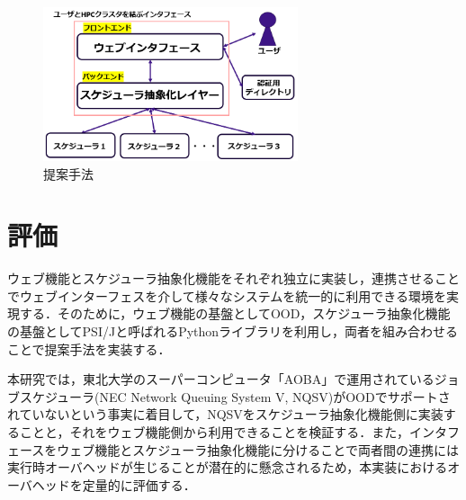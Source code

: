 \documentclass[a4paper,oneside,twocolumn,notitlepage,dvipdfmx]{jsarticle}
\begin{document}
\begin{figure}[h]
  \centering
  \includegraphics[width=75mm]{./fig/proposed_method.png}
  \caption{提案手法}
  \label{fig1}
\end{figure}

\section{評価}
ウェブ機能とスケジューラ抽象化機能をそれぞれ独立に実装し，連携させることでウェブインターフェスを介して様々なシステムを統一的に利用できる環境を実現する．そのために，ウェブ機能の基盤としてOOD，スケジューラ抽象化機能の基盤としてPSI/J\cite{citation_6}と呼ばれるPythonライブラリを利用し，両者を組み合わせることで提案手法を実装する．\par
本研究では，東北大学のスーパーコンピュータ「AOBA」で運用されているジョブスケジューラ(NEC Network Queuing System V, NQSV)がOODでサポートされていないという事実に着目して，NQSVをスケジューラ抽象化機能側に実装することと，それをウェブ機能側から利用できることを検証する．また，インタフェースをウェブ機能とスケジューラ抽象化機能に分けることで両者間の連携には実行時オーバヘッドが生じることが潜在的に懸念されるため，本実装におけるオーバヘッドを定量的に評価する．\par
\end{document}

